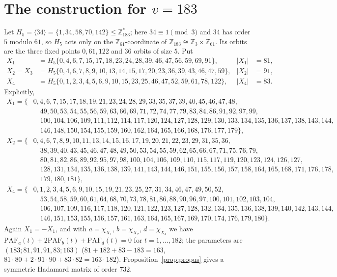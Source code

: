 \documentclass[11pt]{article}
\numberwithin{equation}{section}
\theoremstyle{definition}
\theoremstyle{remark}
\newcommand{\Z}{\mathbb Z}
\newcommand{\PAF}{\mathrm{PAF}}
\begin{document}
\section{The construction for $v=183$}\label{sec:183}
Let $H_5=\langle34\rangle=\{1,34,58,70,142\}\le\Z_{183}^{*}$; here $34\equiv1\pmod3$ and $34$ has order $5$
modulo $61$, so $H_5$ acts only on the $\Z_{61}$-coordinate of $\Z_{183}\cong\Z_3\times\Z_{61}$. Its orbits
are the three fixed points $0,61,122$ and $36$ orbits of size $5$. Put
\begin{align*}
X_1&=H_5\{0,4,6,7,15,17,18,23,24,28,39,46,47,56,59,69,91\}, & |X_1|&=81,\\
X_2=X_3&=H_5\{0,4,6,7,8,9,10,13,14,15,17,20,23,36,39,43,46,47,59\}, & |X_2|&=91,\\
X_4&=H_5\{0,1,2,3,4,5,6,9,10,15,23,25,46,47,52,59,61,78,122\}, & |X_4|&=83.
\end{align*}
Explicitly,
{\small
\begin{align*}
X_1=\{&0, 4, 6, 7, 15, 17, 18, 19, 21, 23, 24, 28, 29, 33, 35, 37, 39, 40, 45, 46, 47, 48,\\&\quad 49, 50, 53, 54, 55, 56, 59, 63, 66, 69, 71, 72, 74, 77, 79, 83, 84, 86, 91, 92, 97, 99,\\&\quad 100, 104, 106, 109, 111, 112, 114, 117, 120, 124, 127, 128, 129, 130, 133, 134, 135, 136, 137, 138, 143, 144,\\&\quad 146, 148, 150, 154, 155, 159, 160, 162, 164, 165, 166, 168, 176, 177, 179\},\\
X_2=\{&0, 4, 6, 7, 8, 9, 10, 11, 13, 14, 15, 16, 17, 19, 20, 21, 22, 23, 29, 31, 35, 36,\\&\quad 38, 39, 40, 43, 45, 46, 47, 48, 49, 50, 53, 54, 55, 59, 62, 65, 66, 67, 71, 75, 76, 79,\\&\quad 80, 81, 82, 86, 89, 92, 95, 97, 98, 100, 104, 106, 109, 110, 115, 117, 119, 120, 123, 124, 126, 127,\\&\quad 128, 131, 134, 135, 136, 138, 139, 141, 143, 144, 146, 151, 155, 156, 157, 158, 164, 165, 168, 171, 176, 178,\\&\quad 179, 180, 181\},\\
X_4=\{&0, 1, 2, 3, 4, 5, 6, 9, 10, 15, 19, 21, 23, 25, 27, 31, 34, 46, 47, 49, 50, 52,\\&\quad 53, 54, 58, 59, 60, 61, 64, 68, 70, 73, 78, 81, 86, 88, 90, 96, 97, 100, 101, 102, 103, 104,\\&\quad 106, 107, 109, 116, 117, 118, 120, 121, 122, 123, 127, 128, 132, 134, 135, 136, 138, 139, 140, 142, 143, 144,\\&\quad 146, 151, 153, 155, 156, 157, 161, 163, 164, 165, 167, 169, 170, 174, 176, 179, 180\}.
\end{align*}}
Again $X_1=-X_1$, and with $a=\chi_{X_1}$, $b=\chi_{X_2}$, $d=\chi_{X_4}$ we have
$\PAF_a(t)+2\PAF_b(t)+\PAF_d(t)=0$ for $t=1,\dots,182$; the parameters are $(183;81,91,91,83;163)$
($81+182+83-183=163$, $81\cdot80+2\cdot91\cdot90+83\cdot82=163\cdot182$). Proposition~\ref{prop:propus}
gives a symmetric Hadamard matrix of order $732$.
\end{document}
